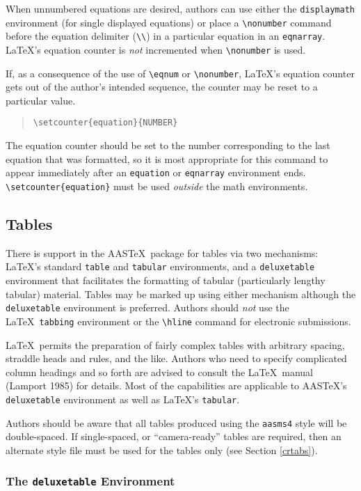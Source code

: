 When unnumbered equations are desired, authors can use either the
{\tt displaymath} environment (for single displayed equations) or place
a \verb"\nonumber" command before the equation delimiter (\verb"\\")
in a particular equation in an {\tt eqnarray}.
\LaTeX's equation counter is {\sl not\/} incremented when
\verb"\nonumber" is used.

If, as a consequence of the use of \verb"\eqnum" or \verb"\nonumber",
\LaTeX's equation counter gets out of the author's intended sequence,
the counter may be reset to a particular value.
\begin{quote}
\verb"\setcounter{equation}{NUMBER}"
\end{quote}
The equation counter should be set to the number corresponding to the
last equation that was formatted, so it is most appropriate for this
command to appear immediately after an {\tt equation} or {\tt eqnarray}
environment ends.
\verb"\setcounter{equation}" must be used {\sl outside\/} the math
environments.

\subsection{Tables}  \label{tables}

There is support in the AAS\TeX\ package for tables via two mechanisms:
\LaTeX's standard {\tt table} and {\tt tabular} environments,
and a {\tt deluxetable} environment that facilitates the formatting
of tabular (particularly lengthy tabular) material.  Tables may be
marked up using either mechanism although the {\tt deluxetable} environment 
is preferred.  Authors should {\it not} use the \LaTeX\
{\tt tabbing} environment or the \verb"\hline" command for electronic
submissions.

\LaTeX\ permits the preparation of fairly complex tables with
arbitrary spacing, straddle heads and rules, and the like.
Authors who need to specify complicated column headings and
so forth are advised to consult the \LaTeX\ manual (Lamport 1985)
for details.
Most of the capabilities are applicable to AAS\TeX's {\tt deluxetable}
environment as well as \LaTeX's {\tt tabular}.

Authors should be aware that all tables produced using the {\tt aasms4}
style will be double-spaced.  If single-spaced, or ``camera-ready'' tables
are required, then an alternate style file must be used for the tables only
(see Section \ref{crtabs}).

\subsubsection{The {\tt deluxetable} Environment}  \label{dte}

